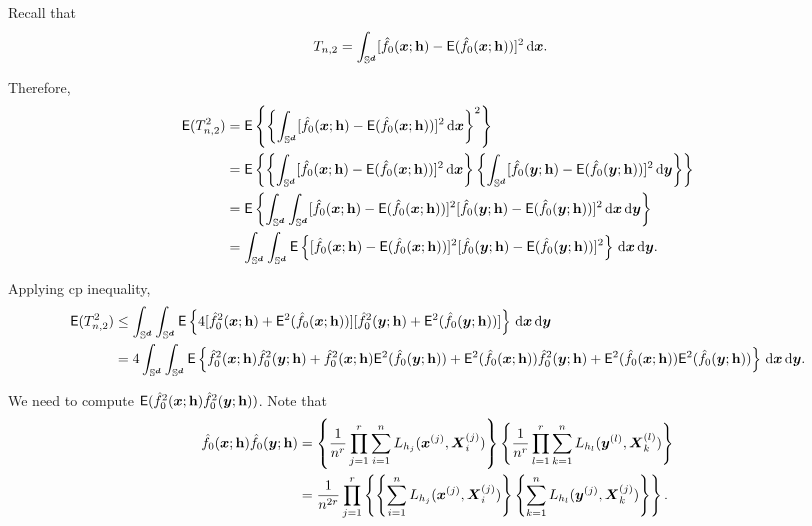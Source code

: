 \documentclass{article}
\begin{document}
Recall that
\begin{align*}
    T_{n,2} &= \int_{\Sr} [ \hat{f}_{0}(\bx;\bh) - \mathsf{E} (\hat{f}_{0}(\bx;\bh)) ]^2 \,\rd \bx.
\end{align*}

Therefore,
\begin{align*}
    \mathsf{E} (T_{n,2}^2) &= \mathsf{E} \lrb{ \lrb{ \int_{\Sr} [ \hat{f}_{0}(\bx;\bh) - \mathsf{E} (\hat{f}_{0}(\bx;\bh)) ]^2 \,\rd \bx }^2 } \\
    &= \mathsf{E} \lrb{ \lrb{ \int_{\Sr} [ \hat{f}_{0}(\bx;\bh) - \mathsf{E} (\hat{f}_{0}(\bx;\bh)) ]^2 \,\rd \bx } \lrb{ \int_{\Sr} [ \hat{f}_{0}(\by;\bh) - \mathsf{E} (\hat{f}_{0}(\by;\bh)) ]^2 \,\rd \by } } \\
    &= \mathsf{E} \lrb{ \int_{\Sr} \int_{\Sr} [ \hat{f}_{0}(\bx;\bh) - \mathsf{E} (\hat{f}_{0}(\bx;\bh)) ]^2 [ \hat{f}_{0}(\by;\bh) - \mathsf{E} (\hat{f}_{0}(\by;\bh)) ]^2 \,\rd \bx \,\rd \by } \\
    &= \int_{\Sr} \int_{\Sr} \mathsf{E} \lrb{ [ \hat{f}_{0}(\bx;\bh) - \mathsf{E} (\hat{f}_{0}(\bx;\bh)) ]^2 [ \hat{f}_{0}(\by;\bh) - \mathsf{E} (\hat{f}_{0}(\by;\bh)) ]^2 } \,\rd \bx \,\rd \by.
\end{align*}

Applying cp inequality,
\begin{align*}
    \mathsf{E} (T_{n,2}^2) & \le \int_{\Sr} \int_{\Sr} \mathsf{E} \lrb{ 4[ \hat{f}_{0}^2(\bx;\bh) + \mathsf{E}^2 (\hat{f}_{0}(\bx;\bh)) ] [ \hat{f}_{0}^2(\by;\bh) + \mathsf{E}^2 (\hat{f}_{0}(\by;\bh)) ] } \,\rd \bx \,\rd \by \\
    &= 4 \int_{\Sr} \int_{\Sr} \mathsf{E} \lrb{ \hat{f}_{0}^2(\bx;\bh)\hat{f}_{0}^2(\by;\bh) + \hat{f}_{0}^2(\bx;\bh)\mathsf{E}^2 (\hat{f}_{0}(\by;\bh)) + \mathsf{E}^2 (\hat{f}_{0}(\bx;\bh))\hat{f}_{0}^2(\by;\bh) + \mathsf{E}^2 (\hat{f}_{0}(\bx;\bh))\mathsf{E}^2 (\hat{f}_{0}(\by;\bh)) } \,\rd \bx \,\rd \by. \\
\end{align*}

We need to compute $\mathsf{E} (\hat{f}_{0}^2(\bx;\bh)\hat{f}_{0}^2(\by;\bh))$. Note that
\begin{align*}
    \hat{f}_{0}(\bx;\bh)\hat{f}_{0}(\by;\bh) &= \lrb{\frac{1}{n^r} \prod_{j=1}^{r} \sum_{i=1}^{n} L_{h_j} (\bx^{(j)}, \bX_i^{(j)})} \lrb{\frac{1}{n^r} \prod_{l=1}^{r} \sum_{k=1}^{n} L_{h_l} (\by^{(l)}, \bX_k^{(l)})} \\
    &= \frac{1}{n^{2r}} \prod_{j=1}^{r} \lrb{ \lrb{ \sum_{i=1}^{n} L_{h_j} (\bx^{(j)}, \bX_i^{(j)})} \lrb{ \sum_{k=1}^{n} L_{h_l} (\by^{(j)}, \bX_k^{(j)})} }.
\end{align*}
\end{document}
